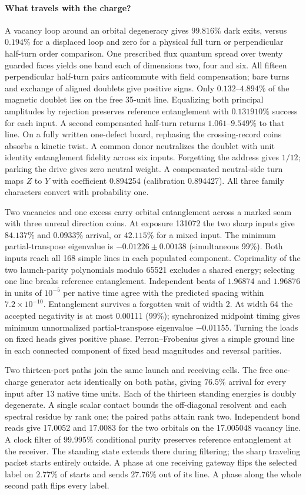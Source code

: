 \paragraph{What travels with the charge?}
A vacancy loop around an orbital degeneracy gives $99.816\%$ dark
exits, versus $0.194\%$ for a displaced loop and zero for a physical
full turn or perpendicular half-turn order comparison. One prescribed
flux quantum spread over twenty guarded faces yields one band each
of dimensions two, four and six. All fifteen perpendicular half-turn
pairs anticommute with field compensation; bare turns and exchange
of aligned doublets give positive signs. Only $0.132$--$4.894\%$ of
the magnetic doublet lies on the free 35-unit line. Equalizing both
principal amplitudes by rejection preserves reference entanglement
with $0.131910\%$ success for each input. A second compensated
half-turn returns $1.061$--$9.549\%$ to that line. On a fully
written one-defect board, rephasing the crossing-record coins absorbs
a kinetic twist. A common donor neutralizes the doublet with unit
identity entanglement fidelity across six inputs. Forgetting the
address gives $1/12$; parking the drive gives zero neutral weight.
A compensated neutral-side turn maps $Z$ to $Y$ with coefficient
0.894254 (calibration 0.894427). All three family characters convert
with probability one.

Two vacancies and one excess carry orbital entanglement across a marked
seam with three unread direction coins. At exposure 131072 the two
sharp inputs give $84.137\%$ and $0.0933\%$ arrival, or $42.115\%$
for a mixed input. The minimum partial-transpose eigenvalue is
$-0.01226\pm0.00138$ (simultaneous 99\%). Both inputs reach all 168
simple lines in each populated component. Coprimality of the two
launch-parity polynomials modulo 65521 excludes a shared energy;
selecting one line breaks reference entanglement. Independent beats
of $1.96874$ and $1.96876$ in units of $10^{-5}$ per native time
agree with the predicted spacing within $7.2\times10^{-10}$.
Entanglement survives a forgotten wait of width 2. At width 64 the
accepted negativity is at most 0.00111 (99\%); synchronized midpoint
timing gives minimum unnormalized partial-transpose eigenvalue
$-0.01155$. Turning the loads on fixed heads gives positive phase.
Perron--Frobenius gives a simple ground line in each connected
component of fixed head magnitudes and reversal parities.

Two thirteen-port paths join the same launch and receiving cells.
The free one-charge generator acts identically on both paths, giving
$76.5\%$ arrival for every input after 13 native time units. Each of
the thirteen standing energies is doubly degenerate. A single scalar
contact bounds the off-diagonal resolvent and each spectral residue
by rank one; the paired paths attain rank two. Independent bond reads
give 17.0052 and 17.0083 for the two orbitals on the 17.005048 vacancy
line. A clock filter of $99.995\%$ conditional purity preserves
reference entanglement at the receiver. The standing state extends
there during filtering; the sharp traveling packet starts entirely
outside. A phase at one receiving gateway flips the selected
label on $2.77\%$ of starts and sends $27.76\%$ out of its line.
A phase along the whole second path flips every label.

